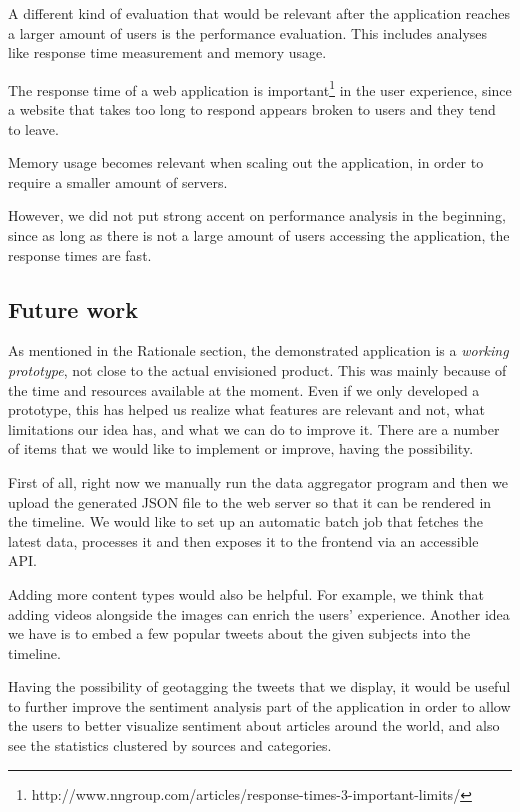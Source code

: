 \documentclass{acm_proc_10ptArticle-sp}
\begin{document}
A different kind of evaluation that would be relevant after the application reaches a larger amount of users is the performance evaluation. This includes analyses like response time measurement and memory usage.

The response time of a web application is important\footnote{http://www.nngroup.com/articles/response-times-3-important-limits/} in the user experience, since a website that takes too long to respond appears broken to users and they tend to leave.

Memory usage becomes relevant when scaling out the application, in order to require a smaller amount of servers.

However, we did not put strong accent on performance analysis in the beginning, since as long as there is not a large amount of users accessing the application, the response times are fast.

\subsection{Future work}

As mentioned in the Rationale section, the demonstrated application is a \textit{working prototype}, not close to the actual envisioned product. This was mainly because of the time and resources available at the moment. Even if we only developed a prototype, this has helped us realize what features are relevant and not, what limitations our idea has, and what we can do to improve it. There are a number of items that we would like to implement or improve, having the possibility.

First of all, right now we manually run the data aggregator program and then we upload the generated JSON file to the web server so that it can be rendered in the timeline. We would like to set up an automatic batch job that fetches the latest data, processes it and then exposes it to the frontend via an accessible API.

Adding more content types would also be helpful. For example, we think that adding videos alongside the images can enrich the users' experience. Another idea we have is to embed a few popular tweets about the given subjects into the timeline.

Having the possibility of geotagging the tweets that we display, it would be useful to further improve the sentiment analysis part of the application in order to allow the users to better visualize sentiment about articles around the world, and also see the statistics clustered by sources and categories.
\end{document}
